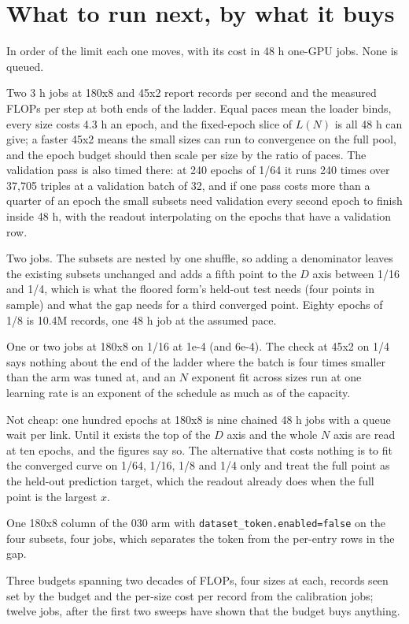 
\section{What to run next, by what it buys}
\label{sec:next}

In order of the limit each one moves, with its cost in 48 h one-GPU jobs. None
is queued.

 Two 3 h jobs
at 180x8 and 45x2 report records per second and the measured FLOPs per step at
both ends of the ladder. Equal paces mean the loader binds, every size costs
4.3 h an epoch, and the fixed-epoch slice of $L(N)$ is all 48 h can give; a
faster 45x2 means the small sizes can run to convergence on the full pool, and
the epoch budget should then scale per size by the ratio of paces. The
validation pass is also timed there: at 240 epochs of 1/64 it runs 240 times
over 37,705 triples at a validation batch of 32, and if one pass costs more than
a quarter of an epoch the small subsets need validation every second epoch to
finish inside 48 h, with the readout interpolating on the epochs that have a
validation row.

 Two jobs. The subsets are nested by
one shuffle, so adding a denominator leaves the existing subsets unchanged and
adds a fifth point to the $D$ axis between 1/16 and 1/4, which is what the floored
form's held-out test needs (four points in sample) and what the gap needs for a
third converged point. Eighty epochs of 1/8 is 10.4M records, one 48 h job at the
assumed pace.

 One or two jobs at 180x8 on
1/16 at 1e-4 (and 6e-4). The check at 45x2 on 1/4 says nothing about the end of
the ladder where the batch is four times smaller than the arm was tuned at, and
an $N$ exponent fit across sizes run at one learning rate is an exponent of the
schedule as much as of the capacity.

 Not cheap: one hundred epochs at 180x8 is
nine chained 48 h jobs with a queue wait per link. Until it exists the top of
the $D$ axis and the whole $N$ axis are read at ten epochs, and the figures say
so. The alternative that costs nothing is to fit the converged curve on 1/64,
1/16, 1/8 and 1/4 only and treat the full point as the held-out prediction
target, which the readout already does when the full point is the largest $x$.

 One 180x8 column of the 030 arm with
\texttt{dataset\_token.enabled=false} on the four subsets, four jobs, which
separates the token from the per-entry rows in the gap.

 Three budgets spanning two decades of FLOPs, four
sizes at each, records seen set by the budget and the per-size cost per record
from the calibration jobs; twelve jobs, after the first two sweeps have shown
that the budget buys anything.
